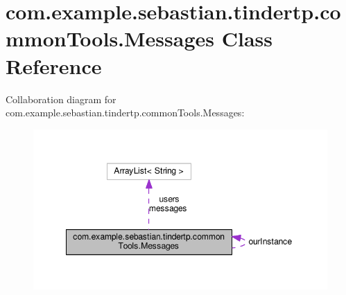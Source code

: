 \hypertarget{classcom_1_1example_1_1sebastian_1_1tindertp_1_1commonTools_1_1Messages}{}\section{com.\+example.\+sebastian.\+tindertp.\+common\+Tools.\+Messages Class Reference}
\label{classcom_1_1example_1_1sebastian_1_1tindertp_1_1commonTools_1_1Messages}


Collaboration diagram for com.\+example.\+sebastian.\+tindertp.\+common\+Tools.\+Messages\+:\nopagebreak
\begin{figure}[H]
\begin{center}
\leavevmode
\includegraphics[width=348pt]{classcom_1_1example_1_1sebastian_1_1tindertp_1_1commonTools_1_1Messages__coll__graph}
\end{center}
\end{figure}
